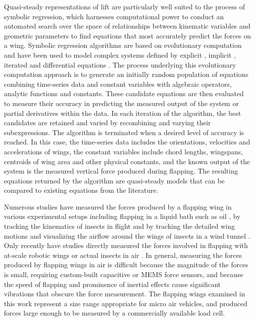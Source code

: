 \documentclass{article}
\begin{document}
Quasi-steady representations of lift are particularly well suited to the process
of symbolic regression, which harnesses computational power to conduct an
automated search over the space of relationships between kinematic variables and
geometric parameters to find equations that most accurately predict the forces
on a wing.  Symbolic regression algorithms are based on evolutionary computation
\cite{koza1992genetic,forrest1993genetic} and have been used to model complex
systems defined by explicit
\cite{duffy2002using,fillon2007symbolic,bautu2005symbolic}, implicit
\cite{schmidt2010symbolic}, iterated \cite{schmidt2009solving} and differential
equations \cite{bongard2007automated}.  The process underlying this evolutionary
computation approach is to generate an initially random population of equations
combining time-series data and constant variables with algebraic operators,
analytic functions and constants.  These candidate equations are then evaluated
to measure their accuracy in predicting the measured output of the system or
partial derivatives within the data.  In each iteration of the algorithm, the
best candidates are retained and varied by recombining and varying their
subexpressions. The algorithm is terminated when a desired level of accuracy is
reached.  In this case, the time-series data includes the orientations,
velocities and accelerations of wings, the constant variables include chord
lengths, wingspans, centroids of wing area and other physical constants, and the
known output of the system is the measured vertical force produced during
flapping.  The resulting equations returned by the algorithm are quasi-steady
models that can be compared to existing equations from the literature.


Numerous studies have measured the forces produced by a flapping wing in various
experimental setups including flapping in a liquid bath such as oil
\cite{walker2009photogrammetric}, by tracking the kinematics of insects in
flight \cite{fry2003aerodynamics,ristroph2009automated} and by tracking the
detailed wing motions and visualizing the airflow around the wings of insects in
a wind tunnel \cite{young2009details}.  Only recently have studies directly
measured the forces involved in flapping with at-scale robotic wings or actual
insects in air \cite{whitney2010aeromechanics,graetzel2008real}.  In general,
measuring the forces produced by flapping wings in air is difficult because the
magnitude of the forces is small, requiring custom-built capacitive or MEMS
force sensors, and because the speed of flapping and prominence of inertial
effects cause significant vibrations that obscure the force measurement.  The
flapping wings examined in this work represent a size range appropriate for
micro air vehicles, and produced forces large enough to be measured by a
commercially available load cell.
\end{document}
